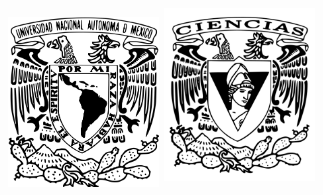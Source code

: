 \thispagestyle{empty}

\begin{figure}[ht]
  \includegraphics[width=4cm]{Logo_UNAM.png}
  \label{EscudoUNAM}
  \endminipage
  \includegraphics[height = 4.9cm ,width=4cm]{Logo_FC.png}
  \label{EscudoFC}
  \endminipage
\end{figure}

